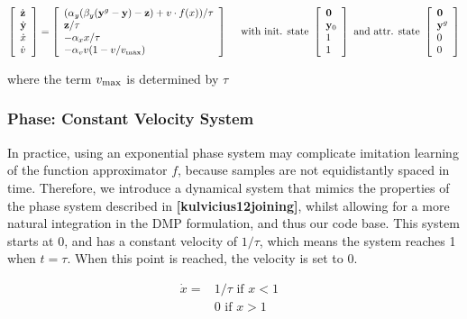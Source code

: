 \begin{eqnarray*} \left[ \begin{array}{l} {\dot{\mathbf{z}}} \\ {\dot{\mathbf{y}}} \\ {\dot{x}} \\ {\dot{v}} \end{array} \right] = \left[ \begin{array}{l} (\alpha_y (\beta_y({\mathbf{y}}^{g}-\mathbf{y})-\mathbf{z}) + v\cdot f(x))/\tau \\ \mathbf{z}/\tau \\ -\alpha_x x/\tau \\ -\alpha_v v (1-v/v_{\mbox{\scriptsize max}}) \end{array} \right] \mbox{~~~~with init. state~} \left[ \begin{array}{l} \mathbf{0} \\ \mathbf{y}_0 \\ 1 \\ 1 \end{array} \right] \mbox{~and attr. state~} \left[ \begin{array}{l} \mathbf{0} \\ \mathbf{y}^g \\ 0 \\ 0 \end{array} \right] \end{eqnarray*}

where the term $ v_{\mbox{\scriptsize max}}$ is determined by $\tau $\hypertarget{page_dmp_sec_dmp_phase}{}\subsubsection{Phase\+: Constant Velocity System}\label{page_dmp_sec_dmp_phase}
In practice, using an exponential phase system may complicate imitation learning of the function approximator $ f $, because samples are not equidistantly spaced in time. Therefore, we introduce a dynamical system that mimics the properties of the phase system described in {\bfseries [kulvicius12joining]}, whilst allowing for a more natural integration in the D\+M\+P formulation, and thus our code base. This system starts at 0, and has a constant velocity of $1/\tau$, which means the system reaches 1 when $t=\tau$. When this point is reached, the velocity is set to 0.

\begin{eqnarray*} \dot{x} =& 1/\tau \mbox{~if~} x < 1 & \\ & 0 \mbox{~if~} x>1 \\ \end{eqnarray*}

